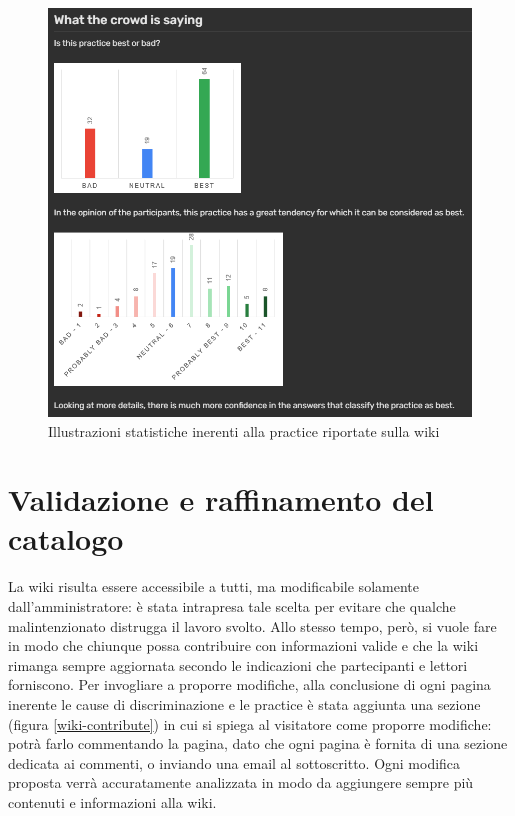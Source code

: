 \begin{figure}[h!]
    \centering
    \includegraphics[width=420pt]{figure/catalog/crowd.png}
    \caption{Illustrazioni statistiche inerenti alla practice riportate sulla wiki}
    \label{wiki-analysis}
\end{figure}

\section{Validazione e raffinamento del catalogo}
La wiki risulta essere accessibile a tutti, ma modificabile solamente dall'amministratore: è stata intrapresa tale scelta per evitare che qualche malintenzionato distrugga il lavoro svolto. Allo stesso tempo, però, si vuole fare in modo che chiunque possa contribuire con informazioni valide e che la wiki rimanga sempre aggiornata secondo le indicazioni che partecipanti e lettori forniscono. Per invogliare a proporre modifiche, alla conclusione di ogni pagina inerente le cause di discriminazione e le practice è stata aggiunta una sezione (figura \ref{wiki-contribute}) in cui si spiega al visitatore come proporre modifiche: potrà farlo commentando la pagina, dato che ogni pagina è fornita di una sezione dedicata ai commenti, o inviando una email al sottoscritto. Ogni modifica proposta verrà accuratamente analizzata in modo da aggiungere sempre più contenuti e informazioni alla wiki.

